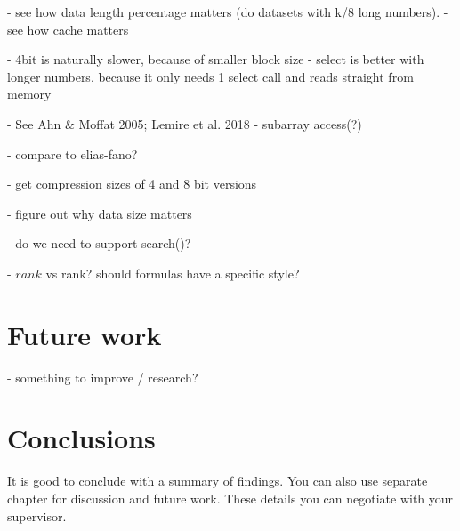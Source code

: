  - see how data length percentage matters (do datasets with k/8 long numbers).
 - see how cache matters

 - 4bit is naturally slower, because of smaller block size
 - select is better with longer numbers, because it only needs 1 select call and reads straight from memory
 
 - See Ahn \& Moffat 2005; Lemire et al. 2018
 - subarray access(?)
 
 - compare to elias-fano?

 - get compression sizes of 4 and 8 bit versions

 - figure out why data size matters

 - do we need to support search()?

 - $rank$ vs rank? should formulas have a specific style?

\chapter{Future work}
 - something to improve / research?

\chapter{Conclusions\label{chapter:conclusions}}

It is good to conclude with a summary of findings. You can also use separate chapter for discussion and future work. These details you can negotiate with your supervisor.
